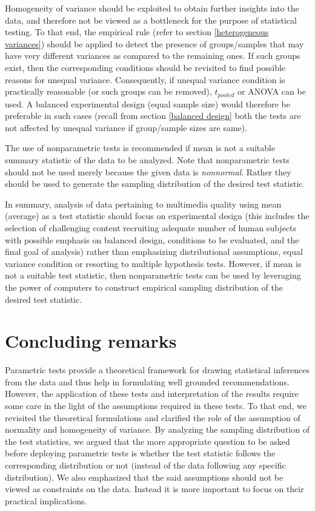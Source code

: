 \documentclass[10pt,final,Twcolumn]{IEEEtran}
\begin{document}
Homogeneity of variance should be exploited to obtain further insights into the data, and therefore not be viewed as a bottleneck for the purpose of statistical testing. To that end, the empirical rule (refer to section \ref{heterogeneous variances}) should be applied to detect the presence of groups/samples that may have very different variances as compared to the remaining ones. If such groups exist, then the corresponding conditions should be revisited to find possible reasons for unequal variance. Consequently, if unequal variance condition is practically reasonable (or such groups can be removed), $t_{pooled}$ or ANOVA can be used. A balanced experimental design (equal sample size) would therefore be preferable in such cases (recall from section \ref{balanced design} both the tests are not affected by unequal variance if group/sample sizes are same). 

The use of nonparametric tests is recommended if mean is not a suitable summary statistic of the data to be analyzed. Note that nonparametric tests should not be used merely because the given data is {\it {nonnormal}}. Rather they should be used to generate the sampling distribution of the desired test statistic. 

In summary, analysis of data pertaining to multimedia quality using mean (average) as a test statistic should focus on experimental design (this includes the selection of challenging content recruiting adequate number of human subjects with possible emphasis on balanced design, conditions to be evaluated, and the final goal of analysis) rather than emphasizing distributional assumptions, equal variance condition or resorting to multiple hypothesis tests. However, if mean is not a suitable test statistic, then nonparametric tests can be used by leveraging the power of computers to construct empirical sampling distribution of the desired test statistic. 

\section{Concluding remarks} \label{concluding remarks}			

Parametric tests provide a theoretical framework for drawing statistical inferences from the data and thus help in formulating well grounded recommendations. However, the application of these tests and interpretation of the results require some care in the light of the assumptions required in these tests. To that end, we revisited the theoretical formulations and clarified the role of the assumption of normality and homogeneity of variance. By analyzing the sampling distribution of the test statistics, we argued that the more appropriate question to be asked before deploying parametric tests is whether the test statistic follows the corresponding distribution or not (instead of the data following any specific distribution). We also emphasized that the said assumptions should not be viewed as constraints on the data. Instead it is more important to focus on their practical implications.   
\end{document}
